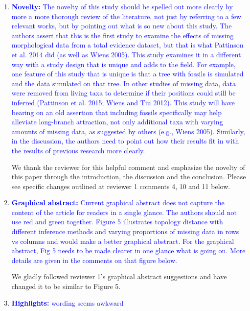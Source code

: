 \documentclass[12pt,letterpaper]{article}
\begin{document}
\begin{enumerate}
\item{\textcolor{blue}{\textbf{Novelty:} The novelty of this study should be spelled out more clearly by more a more thorough review of the literature, not just by referring to a few relevant works, but by pointing out what is so new about this study.
The authors assert that this is the first study to examine the effects of missing morphological data from a total evidence dataset, but that is what Pattinson et al. 2014 did (as well as Wiens 2005).
This study examines it in a different way with a study design that is unique and adds to the field. For example, one feature of this study that is unique is that a tree with fossils is simulated and the data simulated on that tree.
In other studies of missing data, data were removed from living taxa to determine if their positions could still be inferred (Pattinson et al. 2015; Wiens and Tiu 2012).
This study will have bearing on an old assertion that including fossils specifically may help alleviate long-branch attraction, not only additional taxa with varying amounts of missing data, as suggested by others (e.g., Wiens 2005).
Similarly, in the discussion, the authors need to point out how their results fit in with the results of previous research more clearly. }}

We thank the reviewer for this helpful comment and emphasize the novelty of this paper through the introduction, the discussion and the conclusion.
Please see specific changes outlined at reviewer 1 comments 4, 10 and 11 below.

\item{\textcolor{blue}{\textbf{Graphical abstract:} Current graphical abstract does not capture the content of the article for readers in a single glance.
The authors should not use red and green together.
Figure 5 illustrates topology distance with different inference methods and varying proportions of missing data in rows vs columns and would make a better graphical abstract.
For the graphical abstract, Fig 5 needs to be made clearer in one glance what is going on.
More details are given in the comments on that figure below.}}

We gladly followed reviewer 1's graphical abstract suggestions and have changed it to be similar to Figure 5.

\item{\textcolor{blue}{\textbf{Highlights:} wording seems awkward}}


\end{enumerate}
\end{document}
